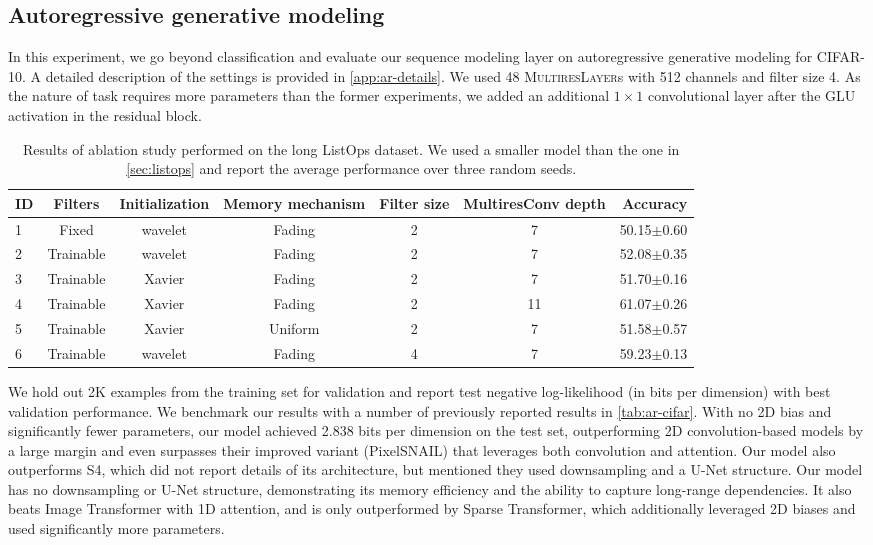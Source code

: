 \documentclass{article}
\theoremstyle{plain}
\theoremstyle{definition}
\theoremstyle{remark}
\newcommand{\ourlayer}{\textsc{MultiresLayer}}
\begin{document}
\subsection{Autoregressive generative modeling}


In this experiment, we go beyond classification and evaluate our sequence modeling layer on autoregressive generative modeling for CIFAR-10. 
A detailed description of the settings is provided in \cref{app:ar-details}. 
We used 48 \ourlayer s with 512 channels and filter size 4. 
As the nature of task requires more parameters than the former experiments, we added an additional $1\times 1$ convolutional layer after the GLU activation in the residual block. 

\begin{table*}[h]
    \vspace{-0.08in}
    \caption{Results of ablation study performed on the long ListOps dataset. We used a smaller model than the one in \cref{sec:listops} and report the average performance over three random seeds. }
    \label{tab:ablation}
    \vskip 0.1in
    \centering
    \begin{small}
        \begin{tabular}{@{}lcccccr}
            \toprule
            ID & Filters & Initialization & Memory mechanism & Filter size & MultiresConv depth & Accuracy \\
            \midrule
            1 & Fixed & wavelet & Fading &  2  & 7 & 50.15$\pm$0.60 \\
            2 & Trainable & wavelet & Fading & 2 & 7 & 52.08$\pm$0.35 \\
            3 & Trainable & Xavier & Fading & 2 &  7 & 51.70$\pm$0.16 \\
            4 & Trainable & Xavier & Fading & 2 & 11 & 61.07$\pm$0.26 \\
            5 & Trainable & Xavier & Uniform & 2 & 7 & 51.58$\pm$0.57 \\
            6 & Trainable & wavelet & Fading & 4 & 7 & 59.23$\pm$0.13 \\
            \bottomrule
        \end{tabular}
    \end{small}
\end{table*}

We hold out 2K examples from the training set for validation and report test negative log-likelihood (in bits per dimension) with best validation performance.
We benchmark our results with a number of previously reported results in \cref{tab:ar-cifar}. 
With no 2D bias and significantly fewer parameters, our model achieved 2.838 bits per dimension on the test set, outperforming 2D convolution-based models by a large margin and even surpasses their improved variant (PixelSNAIL) that leverages both convolution and attention. 
Our model also outperforms S4, which did not report details of its architecture, but mentioned they used downsampling and a U-Net structure. 
Our model has no downsampling or U-Net structure, demonstrating its memory efficiency and the ability to capture long-range dependencies. 
It also beats Image Transformer with 1D attention, and is only outperformed by Sparse Transformer, which additionally leveraged 2D biases and used significantly more parameters. 
\end{document}
